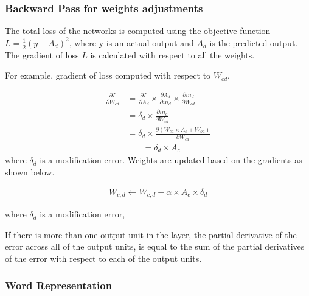 \documentclass[12pt]{report} %
\begin{document}
\subsubsection*{Backward Pass for weights adjustments}
The total loss of the networks is computed using the objective function $L = \frac{1}{2} (y - A_{d})^{2}$, where y is an actual output and $A_{d}$ is the predicted output. The gradient of loss $L$ is calculated with respect to all the weights.

For example, gradient of loss computed with respect to $W_{cd}$, 

\begin{align*} 
\frac{\partial L}{\partial W_{cd}} & = \frac{\partial L}{\partial A_{d}} \times \frac{\partial A_{d}}{\partial in_{d}} \times \frac{\partial in_{d}}{\partial W_{cd}}    \\
& = \delta_{d} \times  \frac{\partial in_{d}}{\partial W_{cd}}  \\
& = \delta_{d} \times  \frac{\partial ( W_{cd} \times A_c + W_{od})}{\partial W_{cd}}
\end{align*}
\begin{align}
& = \delta_{d} \times  A_c
\end{align}  
where $\delta_{d}$ is a modification error. Weights are updated based on the gradients as shown below.

\begin{align} 
W_{c,d} \leftarrow W_{c,d} + \alpha \times A_{c} \times \delta_{d}
\end{align}

where $\delta_{d}$ is a modification error,

%	

If there is more than one output unit in the layer, the partial derivative of the error across all of the output units, is equal to the sum of the partial derivatives of the error with respect to each of the output units.





\subsubsection{Word Representation}
\end{document}
